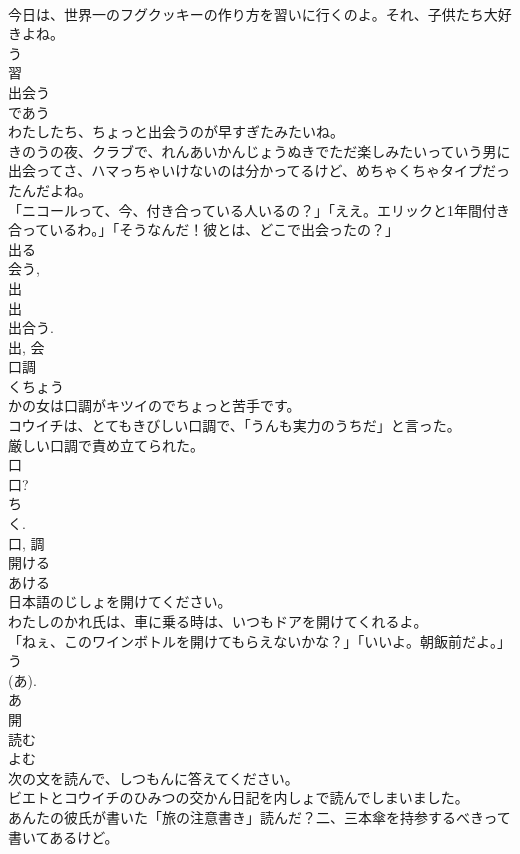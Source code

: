 \documentclass[8pt]{extreport}
\begin{document}
\begin{CJK}{UTF8}{min}
\\	今日は、世界一のフグクッキーの作り方を習いに行くのよ。それ、子供たち大好きよね。	
\\	う 
\\	習	
\\	出会う	
\\	であう	
\\	わたしたち、ちょっと出会うのが早すぎたみたいね。	
\\	きのうの夜、クラブで、れんあいかんじょうぬきでただ楽しみたいっていう男に出会ってさ、ハマっちゃいけないのは分かってるけど、めちゃくちゃタイプだったんだよね。	
\\	「ニコールって、今、付き合っている人いるの？」「ええ。エリックと1年間付き合っているわ。」「そうなんだ！彼とは、どこで出会ったの？」	
\\	出る 
\\	会う, 
\\	出 
\\	出 
\\	出合う. 
\\	出, 会	
\\	口調	
\\	くちょう	
\\	かの女は口調がキツイのでちょっと苦手です。	
\\	コウイチは、とてもきびしい口調で、「うんも実力のうちだ」と言った。	
\\	厳しい口調で責め立てられた。	
\\	口 
\\	口? 
\\	ち 
\\	く. 
\\	口, 調	
\\	開ける	
\\	あける	
\\	日本語のじしょを開けてください。	
\\	わたしのかれ氏は、車に乗る時は、いつもドアを開けてくれるよ。	
\\	「ねぇ、このワインボトルを開けてもらえないかな？」「いいよ。朝飯前だよ。」	
\\	う 
\\	(あ). 
\\	あ 
\\	開	
\\	読む	
\\	よむ	
\\	次の文を読んで、しつもんに答えてください。	
\\	ビエトとコウイチのひみつの交かん日記を内しょで読んでしまいました。	
\\	あんたの彼氏が書いた「旅の注意書き」読んだ？二、三本傘を持参するべきって書いてあるけど。	

\end{CJK}
\end{document}
